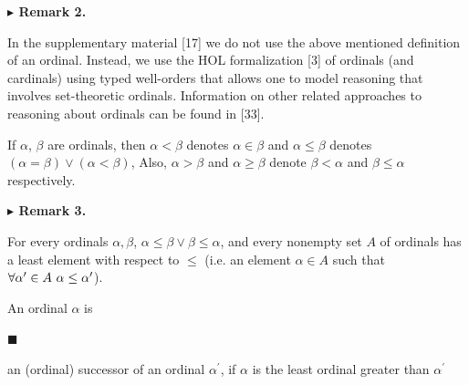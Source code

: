 \documentclass[10pt,a4paper]{amsart}
\begin{document}
 
 
\par\medskip\noindent\textbf{$\blacktriangleright$ Remark 2.}\par
 
 
In the supplementary material [17] we do not use the above mentioned definition of an ordinal. Instead, we use the HOL formalization [3] of ordinals (and cardinals) using typed well-orders that allows one to model reasoning that involves set-theoretic ordinals. Information on other related approaches to reasoning about ordinals can be found in [33].\par
 
 
 
 
If $\alpha$, $\beta$ are ordinals, then $\alpha<\beta$ denotes $\alpha\in\beta$ and $\alpha\leq\beta$ denotes $(\alpha=\beta)\vee(\alpha<\beta)$, Also, $\alpha>\beta$ and $\alpha\geq\beta$ denote $\beta<\alpha$ and $\beta\leq\alpha$ respectively.\par
 
 
 
\par\medskip\noindent\textbf{$\blacktriangleright$ Remark 3.}\par
 
 
For every ordinals $\alpha,\beta$, $\alpha\leq\beta\vee\beta\leq\alpha$, and every nonempty set $A$ of ordinals has a least element with respect to $\leq$ (i.e. an element $\alpha\in A$ such that $\forall\alpha^{\prime}\in A\leavevmode\nobreak\ \alpha\leq\alpha^{\prime}$).\par
 
 
 
 
An ordinal $\alpha$ is\par
  
\par\noindent  $\blacksquare$ 
 
an (ordinal) successor of an ordinal $\alpha^{\prime}$, if $\alpha$ is the least ordinal greater than $\alpha^{\prime}$\par
 
\end{document}
